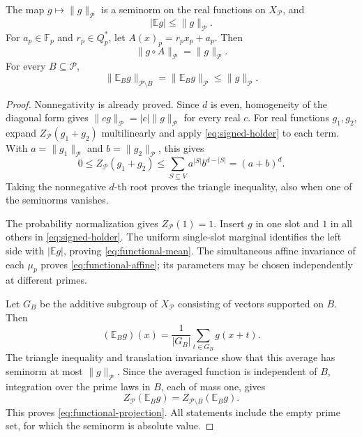 \begin{lemma}
\label{lem:functional-properties}
The map \(g\mapsto\|g\|_{\mathcal P}\) is a seminorm on the real
functions on \(X_{\mathcal P}\), and
\begin{equation}
 |\mathbb E g|\le\|g\|_{\mathcal P}.
 \label{eq:functional-mean}
\end{equation}
For \(a_p\in\mathbb F_p\) and \(r_p\in Q_p^*\), let
\(A(x)_p=r_px_p+a_p\).  Then
\begin{equation}
 \|g\circ A\|_{\mathcal P}=\|g\|_{\mathcal P}.
 \label{eq:functional-affine}
\end{equation}
For every \(B\subseteq\mathcal P\),
\begin{equation}
 \|\mathbb E_Bg\|_{\mathcal P\setminus B}
   =\|\mathbb E_Bg\|_{\mathcal P}
   \le\|g\|_{\mathcal P}.
 \label{eq:functional-projection}
\end{equation}
\end{lemma}

\begin{proof}
Nonnegativity is already proved.  Since \(d\) is even, homogeneity of
the diagonal form gives \(\|cg\|_{\mathcal P}=|c|\|g\|_{\mathcal P}\)
for every real \(c\).  For real functions \(g_1,g_2\), expand
\(Z_{\mathcal P}(g_1+g_2)\) multilinearly and apply
\eqref{eq:signed-holder} to each term.  With
\(a=\|g_1\|_{\mathcal P}\) and \(b=\|g_2\|_{\mathcal P}\), this gives
\[
 0\le Z_{\mathcal P}(g_1+g_2)
 \le\sum_{S\subseteq V}a^{|S|}b^{d-|S|}=(a+b)^d.
\]
Taking the nonnegative \(d\)-th root proves the triangle inequality,
also when one of the seminorms vanishes.

The probability normalization gives \(Z_{\mathcal P}(1)=1\).
Insert \(g\) in one slot and \(1\) in all others in
\eqref{eq:signed-holder}.  The uniform single-slot marginal identifies
the left side with \(|\mathbb E g|\), proving
\eqref{eq:functional-mean}.  The simultaneous affine invariance of each
\(\mu_p\) proves \eqref{eq:functional-affine}; its parameters may be
chosen independently at different primes.

Let \(G_B\) be the additive subgroup of \(X_{\mathcal P}\) consisting
of vectors supported on \(B\).  Then
\[
 (\mathbb E_Bg)(x)=\frac1{|G_B|}\sum_{t\in G_B}g(x+t).
\]
The triangle inequality and translation invariance show that this average
has seminorm at most \(\|g\|_{\mathcal P}\).  Since the averaged
function is independent of \(B\), integration over the prime laws in
\(B\), each of mass one, gives
\[
 Z_{\mathcal P}(\mathbb E_Bg)
   =Z_{\mathcal P\setminus B}(\mathbb E_Bg).
\]
This proves \eqref{eq:functional-projection}.  All statements include
the empty prime set, for which the seminorm is absolute value.
\end{proof}

